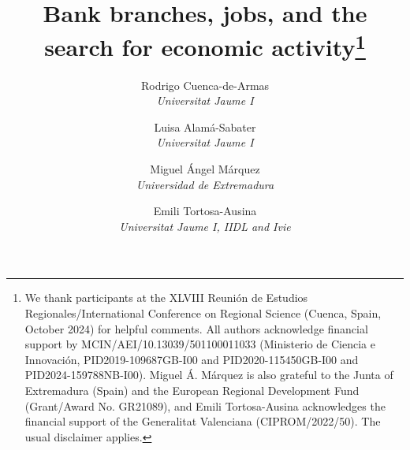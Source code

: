 \documentclass[a4paper,11pt,oneside]{article}
\begin{document}







\title{\textbf{Bank branches, jobs, and the search for economic activity\thanks{\color{black} We thank participants at the XLVIII Reunión de Estudios Regionales/International Conference on Regional Science (Cuenca, Spain, October 2024) for helpful comments. All authors acknowledge financial support by MCIN/AEI/10.13039/501100011033 (Ministerio de Ciencia e Innovaci\'on, PID2019-109687GB-I00 and PID2020-115450GB-I00 and PID2024-159788NB-I00). Miguel \'A. M\'arquez is also grateful to the Junta of Extremadura (Spain) and the European Regional Development Fund (Grant/Award No. GR21089), and Emili Tortosa-Ausina acknowledges the financial support of the Generalitat Valenciana (CIPROM/2022/50). The usual disclaimer applies.}}}

\author{\normalsize Rodrigo Cuenca-de-Armas \\ \textsl{\footnotesize Universitat Jaume I} \and \normalsize Luisa Alamá-Sabater \\ \textsl{\footnotesize Universitat Jaume I} \and \normalsize Miguel Ángel Márquez  \\ \textsl{\footnotesize Universidad de Extremadura}  \and \normalsize Emili Tortosa-Ausina \\ \textsl{\footnotesize Universitat Jaume I, IIDL and Ivie}}










%




% 

%

%

\end{document}
